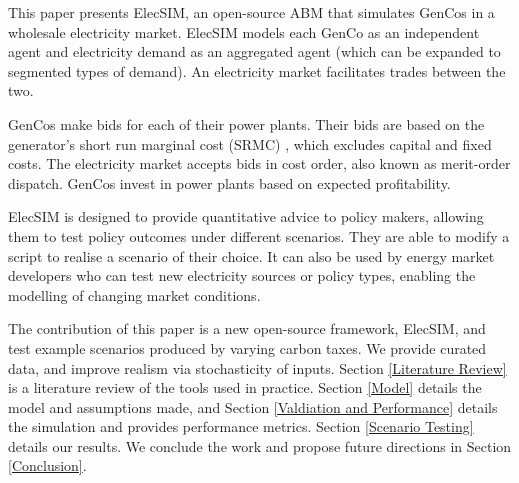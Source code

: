 This paper presents ElecSIM, an open-source ABM that simulates GenCos in a wholesale electricity market. ElecSIM models each GenCo as an independent agent and electricity demand as an aggregated agent (which can be expanded to segmented types of demand). An electricity market facilitates trades between the two. 

GenCos make bids for each of their power plants. Their bids are based on the generator's short run marginal cost (SRMC) \cite{Perloff2012}, which excludes capital and fixed costs. The electricity market accepts bids in cost order, also known as merit-order dispatch. GenCos invest in power plants based on expected profitability.	

ElecSIM is designed to provide quantitative advice to policy makers, allowing them to test policy outcomes under different scenarios. They are able to modify a script to realise a scenario of their choice. It can also be used by energy market developers who can test new electricity sources or policy types, enabling the modelling of changing market conditions.







The contribution of this paper is a new open-source framework, ElecSIM, and test example scenarios produced by varying carbon taxes. We provide curated data, and improve realism via stochasticity of inputs. Section \ref{Literature Review} is a literature review of the tools used in practice. Section \ref{Model} details the model and assumptions made, and Section \ref{Valdiation and Performance} details the simulation and provides performance metrics. Section \ref{Scenario Testing} details our results. We conclude the work and propose future directions in Section \ref{Conclusion}.


